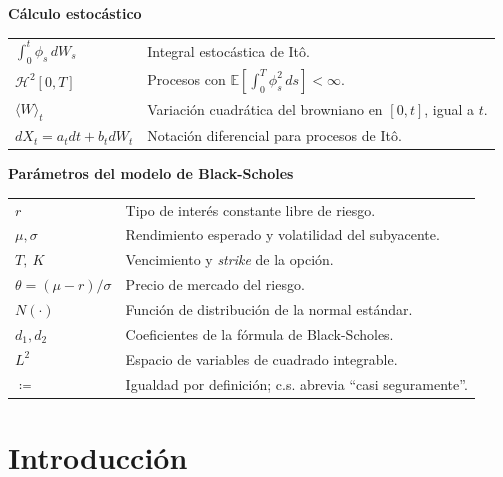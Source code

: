 \documentclass[11pt,a4paper,oneside]{report}
\theoremstyle{plain}
\theoremstyle{definition}
\theoremstyle{remark}
\newcommand{\E}{\mathbb{E}}
\newcommand{\HH}{\mathcal{H}}
\newcommand{\1}{\mathbf{1}}
\newcommand{\eqdef}{\coloneqq}
\begin{document}
\vspace{0.2cm}

\noindent\textbf{Cálculo estocástico}
\begin{center}
\begin{tabular}{@{}p{4cm}p{10cm}@{}}
$\int_0^t \phi_s\, dW_s$ & Integral estocástica de Itô. \\
$\HH^2[0, T]$ & Procesos con $\E[\int_0^T \phi_s^2\, ds] < \infty$. \\
$\langle W\rangle_t$ & Variación cuadrática del browniano en $[0, t]$, igual a $t$. \\
$dX_t = a_t dt + b_t dW_t$ & Notación diferencial para procesos de Itô. \\
\end{tabular}
\end{center}

\newpage

\noindent\textbf{Parámetros del modelo de Black-Scholes}
\begin{center}
\begin{tabular}{@{}p{4cm}p{10cm}@{}}
$r$ & Tipo de interés constante libre de riesgo. \\
$\mu, \sigma$ & Rendimiento esperado y volatilidad del subyacente. \\
$T,\ K$ & Vencimiento y \emph{strike} de la opción. \\
$\theta = (\mu - r)/\sigma$ & Precio de mercado del riesgo. \\
$N(\cdot)$ & Función de distribución de la normal estándar. \\
$d_1, d_2$ & Coeficientes de la fórmula de Black-Scholes. \\
$L^2$ & Espacio de variables de cuadrado integrable. \\
$\eqdef$ & Igualdad por definición; c.s. abrevia ``casi seguramente''. \\
\end{tabular}
\end{center}

\setcounter{page}{1}

\chapter{Introducción}\label{cap:intro}
\end{document}
